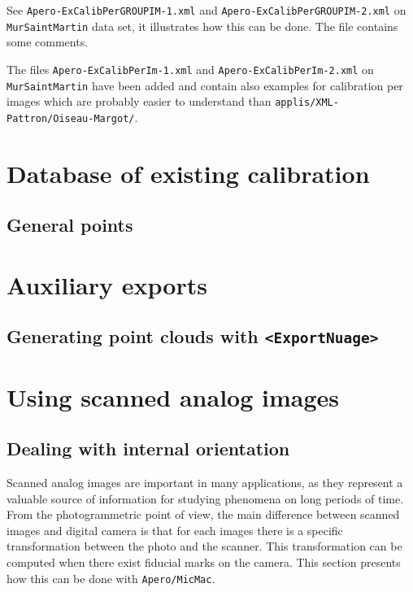 See {\tt Apero-ExCalibPerGROUPIM-1.xml} and
{\tt Apero-ExCalibPerGROUPIM-2.xml}  on  {\tt MurSaintMartin} data
set, it illustrates how this can be done. The file contains
some comments.


The files {\tt Apero-ExCalibPerIm-1.xml} and {\tt Apero-ExCalibPerIm-2.xml}
on  {\tt MurSaintMartin} have been added and contain also
examples for calibration per images which are probably easier to understand
than {\tt  applis/XML-Pattron/Oiseau-Margot/}.


\section{Database of existing calibration}

\label{DB:Calib}
\subsection{General points}


\section{Auxiliary exports}


\subsection{Generating point clouds with {\tt <ExportNuage>}}

\label{Ap:Exp:Nuage}



\section{Using scanned analog images}

\subsection{Dealing with internal orientation}

\label{Analog:Image}
Scanned analog images are important in many applications, as they represent
a valuable source of information for studying phenomena on long periods of time.
From the photogrammetric point of view, the main difference between
scanned images and digital camera is that for each images there
is a specific  transformation between the photo and the scanner.
This transformation can be computed when there exist fiducial marks
on the camera. This section presents how this can be done with {\tt Apero/MicMac}.


